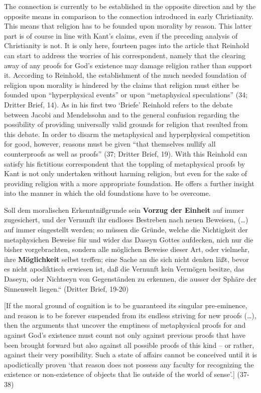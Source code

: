The connection is currently to be established in the opposite direction and by the opposite means in comparison to the connection introduced in early Christianity. This means that religion has to be founded upon morality by reason. This latter part is of course in line with Kant's claims, even if the preceding analysis of Christianity is not. It is only here, fourteen pages into the article that Reinhold can start to address the worries of his correspondent, namely that the clearing away of any proofs for God's existence may damage religion rather than support it. According to Reinhold, the establishment of the much needed foundation of religion upon morality is hindered by the claims that religion must either be founded upon ``hyperphysical events'' or upon ``metaphysical speculations'' (34; Dritter Brief, 14). As in his first two `Briefe' Reinhold refers to the debate between Jacobi and Mendelssohn and to the general confusion regarding the possibility of providing universally valid grounds for religion that resulted from this debate. In order to disarm the metaphysical and hyperphysical competition for good, however, reasons must be given ``that themselves nullify all counterproofs as well as proofs'' (37; Dritter Brief, 19). With this Reinhold can satisfy his fictitious correspondent that the toppling of metaphysical proofs by Kant is not only undertaken without harming religion, but even for the sake of providing religion with a more appropriate foundation. He offers a further insight into the manner in which the old foundations have to be overcome. 

Soll dem moralischen Erkenntni\ss{}grunde sein \textbf{Vorzug der Einheit} auf immer zugesichert, und der Vernunft ihr endloses Bestreben nach neuen Beweisen, (\ldots ) auf immer eingestellt werden; so m\"{u}ssen die Gr\"{u}nde, welche die Nichtigkeit der metaphysichen Beweise f\"{u}r und wider das Daseyn Gottes aufdecken, nich nur die bisher vorgebrachten, sondern alle m\"{o}glichen Beweise dieser Art, oder vielmehr, ihre \textbf{M\"{o}glichkeit }selbst treffen; eine Sache an die sich nicht denken l\"{a}\ss{}t, bevor es nicht apodiktisch erwiesen ist, \quotedblbase da\ss{} die Vernunft kein Verm\"{o}gen besitze, das Daseyn, oder Nichtseyn von Gegenst\"{a}nden zu erkennen, die ausser der Sph\"{a}re der Sinnenwelt liegen.`` (Dritter Brief, 19{-}20)

[If the moral ground of cognition is to be guaranteed its singular pre{-}eminence, and reason is to be forever suspended from its endless striving for new proofs (\ldots ), then the arguments that uncover the emptiness of metaphysical proofs for and against God's existence must count not only against previous proofs that have been brought forward but also against all possible proofs of this kind {--} or rather, against their very possibility. Such a state of affairs cannot be conceived until it is apodictically proven `that reason does not possess any faculty for recognizing the existence or non{-}existence of objects that lie outside of the world of sense'.] (37{-}38)

